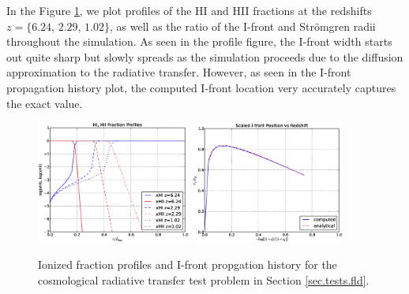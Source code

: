 In the Figure \ref{fig.fld}, we plot profiles of the HI and HII
fractions at the redshifts $z=\{6.24,\, 2.29,\, 1.02\}$, as well as the
ratio of the I-front and Str{\" o}mgren radii throughout the
simulation.  As seen in the profile figure, the I-front width starts
out quite sharp but slowly spreads as the simulation proceeds due to
the diffusion approximation to the radiative transfer.  However, as
seen in the I-front propagation history plot, the computed I-front
location very accurately captures the exact value.

\begin{figure}
\begin{center}
\includegraphics[width=0.45\textwidth]{figures/FLDprofiles.eps}
\includegraphics[width=0.45\textwidth]{figures/FLDhistory.eps}
\caption{Ionized fraction profiles and I-front propgation history for
the cosmological radiative transfer test problem in
Section \ref{sec.tests.fld}.}
\label{fig.fld}
\end{center}
\end{figure}

